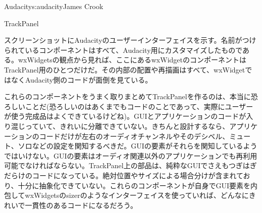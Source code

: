 \begin{aosachapter}{Audacity}{s:audacity}{James Crook}
\begin{aosasect1}{TrackPanel}

スクリーンショットにAudacityのユーザーインターフェイスを示す。名前がつけられているコンポーネントはすべて、Audacity用にカスタマイズしたものである。wxWidgetsの観点から見れば、ここにあるwxWidgetのコンポーネントはTrackPanel用のひとつだけだ。その内部の配置や再描画はすべて、wxWidgetではなくAudacity側のコードが面倒を見ている。

これらのコンポーネントをうまく取りまとめてTrackPanelを作るのは、本当に恐ろしいことだ(恐ろしいのはあくまでもコードのことであって、実際にユーザーが使う完成品はよくできているけどね)。GUIとアプリケーションのコードが入り混じっていて、きれいに分離できていない。きちんと設計するなら、アプリケーションのコードだけが左右のオーディオチャンネルやそのデシベル、ミュート、ソロなどの設定を関知するべきだ。GUIの要素がそれらを関知しているようではいけない。GUIの要素はオーディオ関連以外のアプリケーションでも再利用可能でなければならない。TrackPanel上の部品は、純粋なGUIでさえもつぎはぎだらけのコードになっている。絶対位置やサイズによる場合分けが含まれており、十分に抽象化できていない。これらのコンポーネントが自身でGUI要素を内包してwxWidgetsのsizerのようなインターフェイスを使っていれば、どんなにきれいで一貫性のあるコードになるだろう。


\end{aosasect1}
\end{aosachapter}
